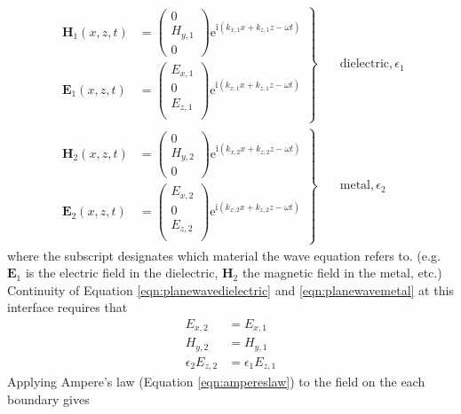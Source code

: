 \documentclass[a4paper,titlepage,onecolumn]{report}
\newcommand{\Equation}[1]{Equation \ref{#1}}
\newcommand{\me}{{\mathrm{e}}}
\newcommand{\mi}{{\mathrm{i}}}
\begin{document}
\begin{align}
\left.\begin{aligned}
\mathbf{H}_1(x,z,t) &=
\begin{pmatrix}
0\\
H_{y,1}\\
0
\end{pmatrix} \me^{\mi(k_{x,1}x+k_{z,1}z-\omega t)}\\
\mathbf{E}_1(x,z,t) &=
\begin{pmatrix}
E_{x,1}\\
0\\
E_{z,1}\\
\end{pmatrix} \me^{\mi(k_{x,1}x+k_{z,1}z-\omega t)}
\end{aligned}
\right\}& \quad \text{dielectric}, \epsilon_1\label{eqn:planewavedielectric}\\
\left.\begin{aligned}
\mathbf{H}_2(x,z,t) &=
\begin{pmatrix}
0\\
H_{y,2}\\
0
\end{pmatrix}
\me^{\mi(k_{x,2}x+k_{z,2}z-\omega t)}\\
\mathbf{E}_2(x,z,t) &=
\begin{pmatrix}
E_{x,2}\\
0\\
E_{z,2}\\
\end{pmatrix}
\me^{\mi(k_{x,2}x+k_{z,2}z-\omega t)}
\end{aligned} 
\right\}&\quad \text{metal}, \epsilon_2
\label{eqn:planewavemetal}
\end{align}
where the subscript designates which material the wave equation refers to.
(e.g. $\mathbf{E}_1$ is the electric field in the dielectric, $\mathbf{H}_2$
the magnetic field in the metal, etc.)
Continuity of \Equation{eqn:planewavedielectric} and
\ref{eqn:planewavemetal} at this interface requires that
\begin{align}
E_{x,2}&=E_{x,1}\\
H_{y,2}&=H_{y,1}\\
\epsilon_2 E_{z,2}&=\epsilon_1 E_{z,1}
\end{align}
Applying Ampere's law (\Equation{eqn:ampereslaw}) to the field on the
each boundary gives
\end{document}
